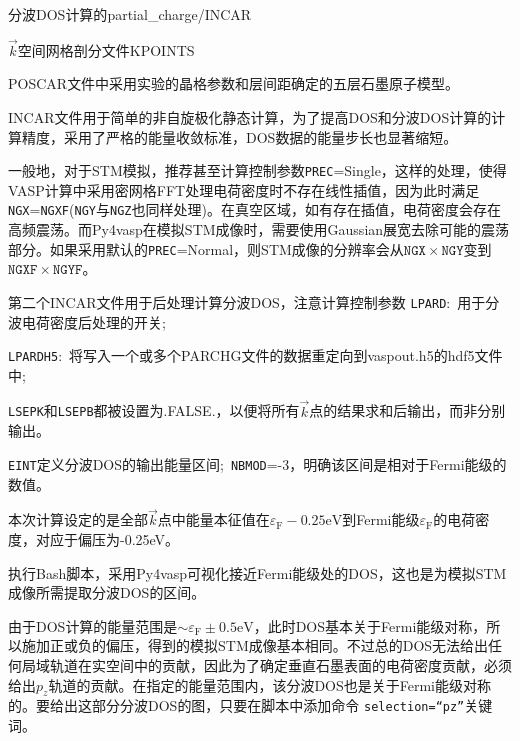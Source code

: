 分波\textrm{DOS}计算的\textrm{partial\_charge/INCAR}

$\vec k$空间网格剖分文件\textrm{KPOINTS}

\textrm{POSCAR}文件中采用实验的晶格参数和层间距确定的五层石墨原子模型。

\textrm{INCAR}文件用于简单的非自旋极化静态计算，为了提高\textrm{DOS}和分波\textrm{DOS}计算的计算精度，采用了严格的能量收敛标准，\textrm{DOS}数据的能量步长也显著缩短。

一般地，对于\textrm{STM}模拟，推荐甚至计算控制参数\texttt{PREC}=\textrm{Single}，这样的处理，使得\textrm{VASP}计算中采用密网格\textrm{FFT}处理电荷密度时不存在线性插值，因为此时满足\texttt{NGX}=\texttt{NGXF}(\texttt{NGY}与\texttt{NGZ}也同样处理)。在真空区域，如有存在插值，电荷密度会存在高频震荡。而\textrm{Py4vasp}在模拟\textrm{STM}成像时，需要使用\textrm{Gaussian}展宽去除可能的震荡部分。如果采用默认的\texttt{PREC}=\textrm{Normal}，则\textrm{STM}成像的分辨率会从$\mathtt{NGX}\times\mathtt{NGY}$变到$\mathtt{NGXF}\times\mathtt{NGYF}$。

第二个\textrm{INCAR}文件用于后处理计算分波\textrm{DOS}，注意计算控制参数
\texttt{LPARD}:~用于分波电荷密度后处理的开关;

\texttt{LPARDH5}:~将写入一个或多个\textrm{PARCHG}文件的数据重定向到\textrm{vaspout.h5}的\textrm{hdf5}文件中;

\texttt{LSEPK}和\texttt{LSEPB}都被设置为\textrm{.FALSE.}，以便将所有$\vec k$点的结果求和后输出，而非分别输出。

\texttt{EINT}定义分波\textrm{DOS}的输出能量区间;~\texttt{NBMOD}=-3，明确该区间是相对于\textrm{Fermi}能级的数值。

本次计算设定的是全部$\vec k$点中能量本征值在$\varepsilon_{\mathrm F}-0.25\mathrm{eV}$到\textrm{Fermi}能级$\varepsilon_{\mathrm F}$的电荷密度，对应于偏压为\textrm{-0.25eV}。

执行\textrm{Bash}脚本，采用\textrm{Py4vasp}可视化接近\textrm{Fermi}能级处的\textrm{DOS}，这也是为模拟\textrm{STM}成像所需提取分波\textrm{DOS}的区间。

由于\textrm{DOS}计算的能量范围是$\sim\varepsilon_{\mathrm F}\pm0.5\mathrm{eV}$，此时\textrm{DOS}基本关于\textrm{Fermi}能级对称，所以施加正或负的偏压，得到的模拟\textrm{STM}成像基本相同。不过总的\textrm{DOS}无法给出任何局域轨道在实空间中的贡献，因此为了确定垂直石墨表面的电荷密度贡献，必须给出$p_z$轨道的贡献。在指定的能量范围内，该分波\textrm{DOS}也是关于\textrm{Fermi}能级对称的。要给出这部分分波\textrm{DOS}的图，只要在脚本中添加命令
\texttt{selection=``pz''}关键词。

